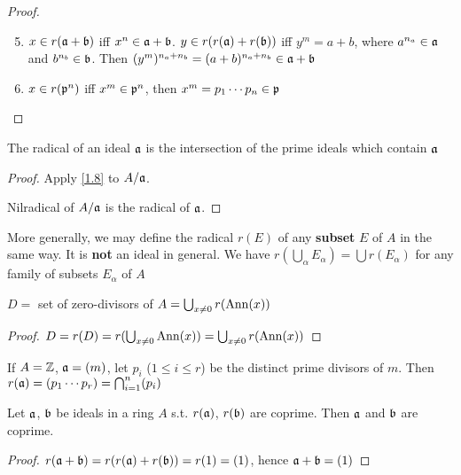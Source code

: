 \documentclass[11pt]{article}
\begin{document}
\begin{proof}
\begin{enumerate}
\setcounter{enumi}{4}
\item \(x\in r(\mathfrak{a}+\mathfrak{b})\) iff \(x^n\in\mathfrak{a}+\mathfrak{b}\). \(y\in r(r(\mathfrak{a})+r(\mathfrak{b}))\) iff \(y^m=a+b\), where \(a^{n_a}\in\mathfrak{a}\)
and \(b^{n_b}\in\mathfrak{b}\).
Then \((y^m)^{n_a+n_b}=(a+b)^{n_a+n_b}\in\mathfrak{a}+\mathfrak{b}\)
\item \(x\in r(\mathfrak{p}^n)\) iff \(x^m\in\mathfrak{p}^n\), then \(x^m=p_1\cdots p_n\in\mathfrak{p}\)
\end{enumerate}
\end{proof}

\begin{proposition}[]
The radical of an ideal \(\mathfrak{a}\) is the intersection of the prime ideals which contain \(\mathfrak{a}\)
\end{proposition}

\begin{proof}
Apply \ref{1.8} to \(A/\mathfrak{a}\).

Nilradical of \(A/\mathfrak{a}\) is the radical of \(\mathfrak{a}\).
\end{proof}

More generally, we may define the radical \(r(E)\) of any \textbf{subset} \(E\) of \(A\) in the same way.
It is \textbf{not} an ideal in general. We have \(r(\bigcup_\alpha E_\alpha)=\bigcup r(E_\alpha)\) for any family of subsets \(E_\alpha\)
of \(A\)

\begin{proposition}[]
\(D=\) set of zero-divisors of \(A=\bigcup_{x\neq 0}r(\operatorname{Ann}(x))\)
\end{proposition}

\begin{proof}
\(D=r(D)=r(\bigcup_{x\neq 0}\operatorname{Ann}(x))=\bigcup_{x\neq 0}r(\operatorname{Ann}(x))\)
\end{proof}

\begin{examplle}[]
If \(A=\mathbb{Z}\), \(\mathfrak{a}=(m)\), let \(p_i\) (\(1\le i\le r\)) be the distinct prime divisors of \(m\).
Then \(r(\mathfrak{a})=(p_1\cdots p_r)=\bigcap_{i=1}^n(p_i)\)
\end{examplle}

\begin{proposition}[]
Let \(\mathfrak{a}\), \(\mathfrak{b}\) be ideals in a ring \(A\) s.t. \(r(\mathfrak{a})\), \(r(\mathfrak{b})\) are coprime. Then \(\mathfrak{a}\)
and \(\mathfrak{b}\) are coprime.
\end{proposition}

\begin{proof}
\(r(\mathfrak{a}+\mathfrak{b})=r(r(\mathfrak{a})+r(\mathfrak{b}))=r(1)=(1)\), hence \(\mathfrak{a}+\mathfrak{b}=(1)\)
\end{proof}
\end{document}
